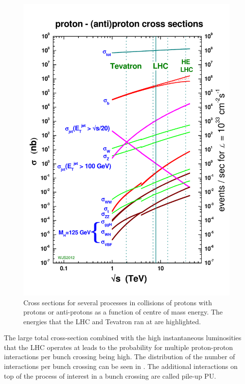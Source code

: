 \begin{figure}
  \includegraphics[width=1.2\largefigwidth]{plots/detector/crosssections2012HE_v4.pdf}
  \caption{Cross sections for several processes in collisions of protons with protons or anti-protons as a function of centre of mass energy. The energies that the LHC and Tevatron ran at are highlighted.\cite{Stirlingppxs}}
  \label{fig:xssummary}
\end{figure}

The large total cross-section combined with the high instantaneous luminosities that the LHC operates at leads to the probability for multiple proton-proton interactions per bunch crossing being high. The distribution of the number of interactions per bunch crossing can be seen in . The additional interactions on top of the process of interest in a bunch crossing are called pile-up \ac{PU}.

